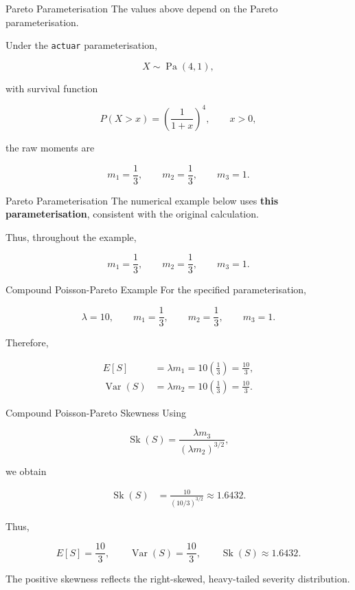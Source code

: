 \documentclass[
  ignorenonframetext,
  aspectratio=169,
]{beamer}
\begin{document}
\begin{frame}[fragile]{Pareto Parameterisation}
\protect{}\label{pareto-parameterisation}
The values above depend on the Pareto parameterisation.

Under the \texttt{actuar} parameterisation,

\[
X\sim\operatorname{Pa}(4,1),
\]

with survival function

\[
P(X>x)=\left(\frac{1}{1+x}\right)^4,
\qquad x>0,
\]

the raw moments are

\[
\boxed{
m_1=\frac13,
\qquad
m_2=\frac13,
\qquad
m_3=1.
}
\]
\end{frame}

\begin{frame}{Pareto Parameterisation}
\protect{}\label{pareto-parameterisation-1}
The numerical example below uses \textbf{this parameterisation},
consistent with the original calculation.

Thus, throughout the example,

\[
\boxed{
m_1=\frac13,\qquad
m_2=\frac13,\qquad
m_3=1.
}
\]
\end{frame}

\begin{frame}{Compound Poisson-Pareto Example}
\protect{}\label{compound-poisson-pareto-example}
For the specified parameterisation,

\[
\lambda=10,
\qquad
m_1=\frac13,
\qquad
m_2=\frac13,
\qquad
m_3=1.
\]

Therefore,

\[
\begin{aligned}
E[S]
&=\lambda m_1
=10\left(\frac13\right)
=\frac{10}{3},\\
\operatorname{Var}(S)
&=\lambda m_2
=10\left(\frac13\right)
=\frac{10}{3}.
\end{aligned}
\]
\end{frame}

\begin{frame}{Compound Poisson-Pareto Skewness}
\protect{}\label{compound-poisson-pareto-skewness}
Using

\[
\operatorname{Sk}(S)
=
\frac{\lambda m_3}
{(\lambda m_2)^{3/2}},
\]

we obtain

\[
\begin{aligned}
\operatorname{Sk}(S)
&=
\frac{10}
{(10/3)^{3/2}}\approx1.6432.
\end{aligned}
\]

Thus,

\[
\boxed{
E[S]=\frac{10}{3},
\qquad
\operatorname{Var}(S)=\frac{10}{3},
\qquad
\operatorname{Sk}(S)\approx1.6432.
}
\]

The positive skewness reflects the right-skewed, heavy-tailed severity
distribution.
\end{frame}
\end{document}
